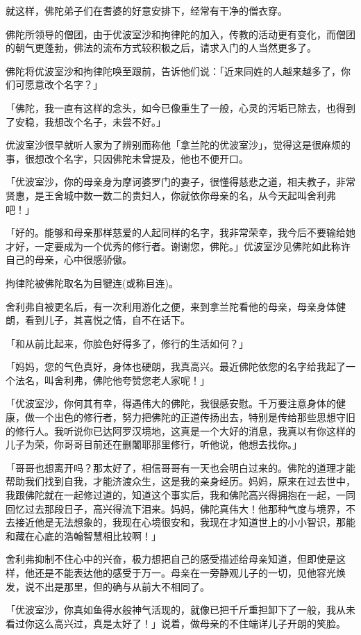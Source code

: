 \documentclass[twoside,openany]{book}
\begin{document}
就这样，佛陀弟子们在耆婆的好意安排下，经常有干净的僧衣穿。

佛陀所领导的僧团，由于优波室沙和拘律陀的加入，传教的活动更有变化，而僧团的朝气更蓬勃，佛法的流布方式较积极之后，请求入门的人当然更多了。

佛陀将优波室沙和拘律陀唤至跟前，告诉他们说：「近来同姓的人越来越多了，你们可愿意改个名字？」

「佛陀，我一直有这样的念头，如今已像重生了一般，心灵的污垢已除去，也得到了安稳，我想改个名子，未尝不好。」

优波室沙很早就听人家为了辨别而称他「拿兰陀的优波室沙」，觉得这是很麻烦的事，很想改个名字，只因佛陀未曾提及，他也不便开口。

「优波室沙，你的母亲身为摩诃婆罗门的妻子，很懂得慈悲之道，相夫教子，非常贤惠，是王舍城中数一数二的贵妇人，你就依你母亲的名，从今天起叫舍利弗吧！」

「好的。能够和母亲那样慈爱的人起同样的名字，我非常荣幸，我今后不要输给她才好，一定要成为一个优秀的修行者。谢谢您，佛陀。」优波室沙见佛陀如此称许自己的母亲，心中很感骄傲。

拘律陀被佛陀取名为目犍连(或称目连)。

舍利弗自被更名后，有一次利用游化之便，来到拿兰陀看他的母亲，母亲身体健朗，看到儿子，其喜悦之情，自不在话下。

「和从前比起来，你脸色好得多了，修行的生活如何？」

「妈妈，您的气色真好，身体也硬朗，我真高兴。最近佛陀依您的名字给我起了一个法名，叫舍利弗，佛陀他夸赞您老人家呢！」

「优波室沙，你何其有幸，得遇伟大的佛陀，我很感安慰。千万要注意身体的健康，做一个出色的修行者，努力把佛陀的正道传扬出去，特别是传给那些思想守旧的修行人。我听说你已达阿罗汉境地，这真是一个大好的消息，我真以有你这样的儿子为荣，你哥哥目前还在删闍耶那里修行，听他说，他想去找你。」

「哥哥也想离开吗？那太好了，相信哥哥有一天也会明白过来的。佛陀的道理才能帮助我们找到自我，才能济渡众生，这是我的亲身经历。妈妈，原来在过去世中，我跟佛陀就在一起修过道的，知道这个事实后，我和佛陀高兴得拥抱在一起，一同回忆过去那段日子，高兴得流下泪来。妈妈，佛陀真伟大！他那种气度与境界，不去接近他是无法想象的，我现在心境很安和，我现在才知道世上的小小智识，那能和藏在心底的浩翰智慧相比较啊！」

舍利弗抑制不住心中的兴奋，极力想把自己的感受描述给母亲知道，但即使是这样，他还是不能表达他的感受于万一。母亲在一旁静观儿子的一切，见他容光焕发，说不出是那里，但的确与从前大不相同了。

「优波室沙，你真如鱼得水般神气活现的，就像已把千斤重担卸下了一般，我从未看过你这么高兴过，真是太好了！」说着，做母亲的不住端详儿子开朗的笑脸。
\end{document}
